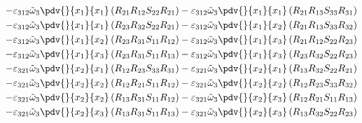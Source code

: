 \begin{equation}
	\begin{split}
		-\varepsilon_{312}\tilde{\omega}_{3}\pdv{}{x_{1}}{x_{1}}\left(R_{21}R_{12}S_{22}R_{21}\right)		-\varepsilon_{312}\tilde{\omega}_{3}\pdv{}{x_{1}}{x_{1}}\left(R_{21}R_{13}S_{33}R_{31}\right)\\
		-\varepsilon_{312}\tilde{\omega}_{3}\pdv{}{x_{1}}{x_{1}}\left(R_{23}R_{32}S_{22}R_{21}\right)		-\varepsilon_{312}\tilde{\omega}_{3}\pdv{}{x_{1}}{x_{2}}\left(R_{21}R_{13}S_{33}R_{32}\right)\\
		-\varepsilon_{312}\tilde{\omega}_{3}\pdv{}{x_{1}}{x_{2}}\left(R_{23}R_{31}S_{11}R_{12}\right)		-\varepsilon_{312}\tilde{\omega}_{3}\pdv{}{x_{1}}{x_{3}}\left(R_{21}R_{12}S_{22}R_{23}\right)\\
		-\varepsilon_{312}\tilde{\omega}_{3}\pdv{}{x_{1}}{x_{3}}\left(R_{23}R_{31}S_{11}R_{13}\right)		-\varepsilon_{312}\tilde{\omega}_{3}\pdv{}{x_{1}}{x_{3}}\left(R_{23}R_{32}S_{22}R_{23}\right)\\
		-\varepsilon_{321}\tilde{\omega}_{3}\pdv{}{x_{2}}{x_{1}}\left(R_{12}R_{23}S_{33}R_{31}\right)		-\varepsilon_{321}\tilde{\omega}_{3}\pdv{}{x_{2}}{x_{1}}\left(R_{13}R_{32}S_{22}R_{21}\right)\\
		-\varepsilon_{321}\tilde{\omega}_{3}\pdv{}{x_{2}}{x_{2}}\left(R_{12}R_{21}S_{11}R_{12}\right)		-\varepsilon_{321}\tilde{\omega}_{3}\pdv{}{x_{2}}{x_{2}}\left(R_{12}R_{23}S_{33}R_{32}\right)\\
		-\varepsilon_{321}\tilde{\omega}_{3}\pdv{}{x_{2}}{x_{2}}\left(R_{13}R_{31}S_{11}R_{12}\right)		-\varepsilon_{321}\tilde{\omega}_{3}\pdv{}{x_{2}}{x_{3}}\left(R_{12}R_{21}S_{11}R_{13}\right)\\
		-\varepsilon_{321}\tilde{\omega}_{3}\pdv{}{x_{2}}{x_{3}}\left(R_{13}R_{31}S_{11}R_{13}\right)		-\varepsilon_{321}\tilde{\omega}_{3}\pdv{}{x_{2}}{x_{3}}\left(R_{13}R_{32}S_{22}R_{23}\right)\\
	\end{split}
\end{equation}
